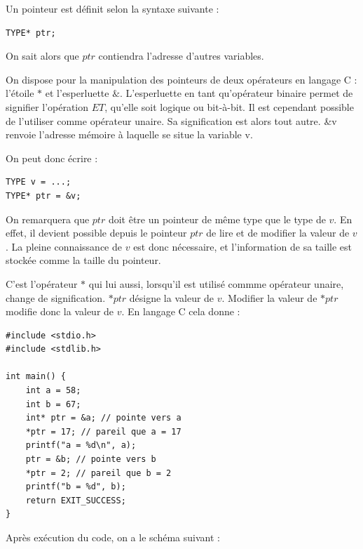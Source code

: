 \documentclass[../../../main.tex]{subfiles}
\begin{document}
Un pointeur est définit selon la syntaxe suivante :
\begin{verbatim}
TYPE* ptr;
\end{verbatim}
On sait alors que $ptr$ contiendra l'adresse d'autres variables.
 
On dispose pour la manipulation des pointeurs de deux opérateurs en langage C : l'étoile $\ast$ et l'esperluette $\&$. L'esperluette en tant qu'opérateur binaire permet de signifier l'opération $ET$, qu'elle soit logique ou bit-à-bit. Il est cependant possible de l'utiliser comme opérateur unaire. Sa signification est alors tout autre. \textsf{\&v} renvoie l'adresse mémoire à laquelle se situe la variable \textsf{v}. 

\begin{minipage}{\textwidth}
	\begin{center}
		
	\end{center}
\end{minipage}

On peut donc écrire :
\begin{verbatim}
TYPE v = ...;
TYPE* ptr = &v;
\end{verbatim}
On remarquera que $ptr$ doit être un pointeur de même type que le type de $v$. En effet, il devient possible depuis le pointeur $ptr$ de lire et de modifier la valeur de $v$. La pleine connaissance de $v$ est donc nécessaire, et l'information de sa taille est stockée comme la taille du pointeur.
 
C'est l'opérateur $*$ qui lui aussi, lorsqu'il est utilisé commme opérateur unaire, change de signification. $*ptr$ désigne la valeur de $v$. Modifier la valeur de $*ptr$ modifie donc la valeur de $v$. En langage C cela donne :
\begin{verbatim}
#include <stdio.h>
#include <stdlib.h>

int main() {
	int a = 58;
	int b = 67;
	int* ptr = &a; // pointe vers a
	*ptr = 17; // pareil que a = 17
	printf("a = %d\n", a);
	ptr = &b; // pointe vers b
	*ptr = 2; // pareil que b = 2
	printf("b = %d", b);
	return EXIT_SUCCESS;
}
\end{verbatim}
Après exécution du code, on a le schéma suivant :

\begin{minipage}{\textwidth}
	\begin{center}
		
	\end{center}
\end{minipage}
\end{document}
